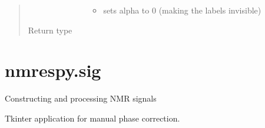 \documentclass[letterpaper,10pt,english]{sphinxmanual}
\begin{document}
\begin{fulllineitems}
\begin{quote}
\begin{description}
\begin{itemize}
\begin{description}
\begin{itemize}
\item {} 
\sphinxAtStartPar
{} sets alpha to 0 (making the labels invisible)

\end{itemize}

\end{description}

\end{itemize}


\item[{Return type}] \leavevmode
\sphinxAtStartPar
{\hyperref[\detokenize{references/plot:nmrespy.plot.NmrespyPlot}]{}}

\end{description}\end{quote}

\end{fulllineitems}





\section{nmrespy.sig}
\label{\detokenize{references/sig:module-nmrespy.sig}}\label{\detokenize{references/sig:nmrespy-sig}}\label{\detokenize{references/sig::doc}}
\sphinxAtStartPar
Constructing and processing NMR signals

\begin{fulllineitems}
\label{\detokenize{references/sig:nmrespy.sig.PhaseApp}}
\sphinxAtStartPar
Tkinter application for manual phase correction.


\nopagebreak


\sphinxAtStartPar
{\hyperref[\detokenize{references/sig:nmrespy.sig.manual_phase_spectrum}]{}}



\end{fulllineitems}

\end{document}
